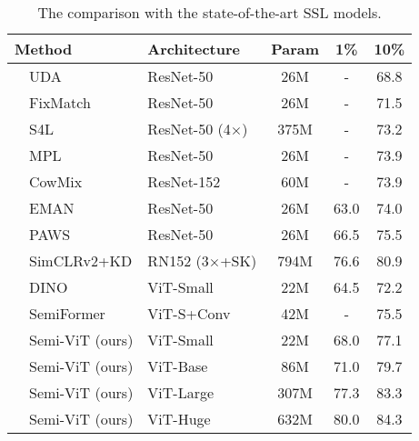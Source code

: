 \documentclass{article}
\begin{document}
\setlength{\tabcolsep}{10pt}
\begin{table}[t]
\begin{center}
\small
\begin{tabular}{lllccc}
\toprule
\multicolumn{2}{l}{Method} &Architecture &Param & 1\% & 10\% \\\hline
\parbox[t]{2mm}{} &UDA \cite{DBLP:conf/nips/XieDHL020} &ResNet-50 &26M &- &68.8 \\
&FixMatch \cite{DBLP:conf/nips/SohnBCZZRCKL20} &ResNet-50 &26M &- &71.5 \\
&S4L \cite{DBLP:conf/iccv/BeyerZOK19} &ResNet-50 (4$\times$) &375M &- &73.2 \\
&MPL \cite{DBLP:conf/cvpr/PhamDXL21} &ResNet-50 &26M &- &73.9 \\
&CowMix \cite{DBLP:conf/visapp/FrenchOS22} &ResNet-152 &60M &- &73.9 \\
&EMAN \cite{DBLP:conf/cvpr/CaiRMFTS21} &ResNet-50 &26M &63.0 &74.0 \\
&PAWS \cite{DBLP:conf/iccv/AssranCMBJBR21} &ResNet-50 &26M &66.5 &75.5 \\
&SimCLRv2+KD \cite{DBLP:conf/nips/ChenKSNH20} &RN152 (3$\times$+SK) &794M &76.6 &80.9 \\\hline
\parbox[t]{2mm}{} &DINO \cite{DBLP:conf/iccv/CaronTMJMBJ21} &ViT-Small &22M &64.5 &72.2 \\
&SemiFormer \cite{weng2021semi} &ViT-S+Conv &42M &- &75.5 \\
&Semi-ViT (ours) &ViT-Small &22M &68.0 &77.1 \\
&Semi-ViT (ours) &ViT-Base &86M &71.0 &79.7 \\
&Semi-ViT (ours) &ViT-Large &307M &77.3 &83.3 \\
&Semi-ViT (ours) &ViT-Huge &632M &80.0 &84.3 \\
\bottomrule
\end{tabular}
\caption{The comparison with the state-of-the-art SSL models.}
\label{tab:sota}
\end{center}\vspace{-3mm}
\end{table}
\end{document}
